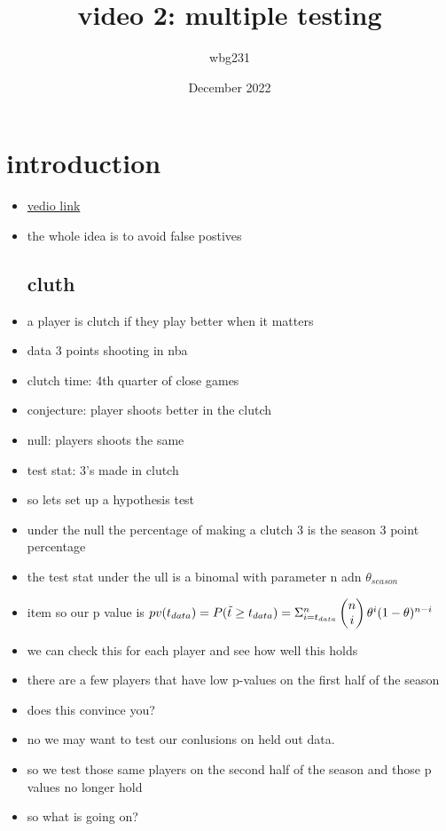 \documentclass{article}
\title{video 2: multiple testing  }
\author{wbg231 }
\date{December 2022}
\begin{document}
\maketitle

\section* {introduction}
\begin{itemize}
\item \href{https://www.youtube.com/watch?v=99JYHjZkSw8&list=PLBEf5mJtE6KuZ5NBQMuWIMsiOOrV9ibzm&index=83}{vedio link}
\item the whole idea is to avoid false postives
\subsection*{cluth}
\item a player is clutch if they play better when it matters 
\item data 3 points shooting in nba 
\item clutch time: 4th quarter of close games 
\item conjecture: player shoots better in the clutch
\item null: players shoots the same 
\item test stat: 3's made in clutch
\item so lets set up a hypothesis test
\item under the null the percentage of making a clutch 3 is the season 3 point percentage 
\item the test stat under the ull is a binomal with parameter n adn $\theta_{season}$
\item item so our p value is $pv(t_{data})=P(\Tilde{t}\geq t_{data})=\Sigma_{i=t_{data}}^{n}\begin{pmatrix}
    n\\i
\end{pmatrix}\theta^{i}(1-\theta)^{n-i}$
\item we can check this for each player and see how well this holds 
\item there are a few players that have low p-values on the first half of the season
\item does this convince you?
\item no we may want to test our conlusions on held out data.
\item so we test those same players on the second half of the season and those p values no longer hold 
\item so what is going on?

\end{itemize}
\end{document}
